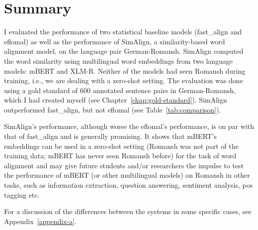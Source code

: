  
\section{Summary}
I evaluated the performance of  two statistical baseline models (fast\_align and eflomal)  as well as the performance of SimAlign, a similarity-based word alignment model, on the language pair German-Romansh. 
SimAlign computed the word similarity using multilingual word embeddings from two language models: mBERT and XLM-R. Neither of the models had seen Romansh during training, i.e., we are dealing with a zero-shot setting.
The evaluation was done using a gold standard of 600 annotated sentence pairs in German-Romansh, which I had created myself (see Chapter~\ref{chap:gold-standard}).
SimAlign outperformed fast\_align, but not eflomal (see Table~\ref{tab:comparison}). 

SimAlign's performance, although worse the eflomal's performance, is on par with that of fast\_align and is generally promising. 
It shows that mBERT's embeddings can be used in a zero-shot setting (Romansh was not part of the training data; mBERT has never seen Romansh before) for the task of word alignment and may give future students and/or researchers the impulse to test the performance of mBERT (or other multilingual models) on Romansh in other tasks, such as information extraction, question answering, sentiment analysis, \acrshort{pos} tagging etc.

For a discussion of the differences between the systems in some specific cases, see Appendix~\ref{appendix-a}.



